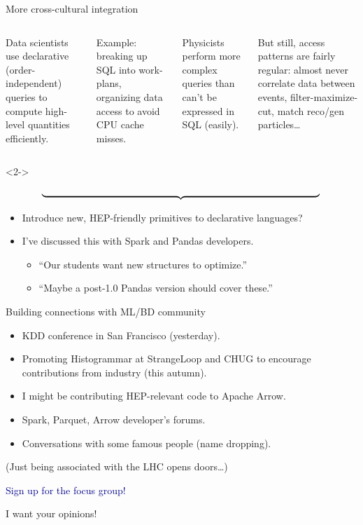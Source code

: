 \documentclass{beamer}
\begin{document}
\begin{frame}{More cross-cultural integration}
\vspace{0.5 cm}
\begin{columns}
Data scientists use declarative (order-independent) queries to compute high-level quantities efficiently.

\vspace{0.25 cm}
Example: breaking up SQL into work-plans, organizing data access to avoid CPU cache misses.

Physicists perform more complex queries than can't be expressed in SQL (easily).

\vspace{0.25 cm}
But still, access patterns are fairly regular: almost never correlate data between events, filter-maximize-cut, match reco/gen particles\ldots
\end{columns}

\begin{uncoverenv}<2->
\vspace{-0.5 cm}
\[ \underbrace{\mbox{\hspace{10 cm}}}{} \]

\begin{itemize}
\item Introduce new, HEP-friendly primitives to declarative languages?
\item I've discussed this with Spark and Pandas developers.
\begin{itemize}
\item ``Our students want new structures to optimize.''
\item ``Maybe a post-1.0 Pandas version should cover these.''
\end{itemize}
\end{itemize}
\end{uncoverenv}
\end{frame}

\begin{frame}{Building connections with ML/BD community}

\vspace{0.5 cm}
\begin{itemize}\setlength{\itemsep}{0.5 cm}
\item KDD conference in San Francisco (yesterday).
\item Promoting Histogrammar at StrangeLoop and CHUG to encourage contributions from industry (this autumn).
\item I might be contributing HEP-relevant code to Apache Arrow.
\item Spark, Parquet, Arrow developer's forums.
\item Conversations with some famous people (name dropping).
\end{itemize}

\vspace{1 cm}
(Just being associated with the LHC opens doors\ldots)
\end{frame}

\begin{frame}{}
\begin{center}
\textcolor{darkblue}{\Huge Sign up for the focus group!}

\vspace{1 cm}
\Large I want your opinions!
\end{center}
\end{frame}
\end{document}
